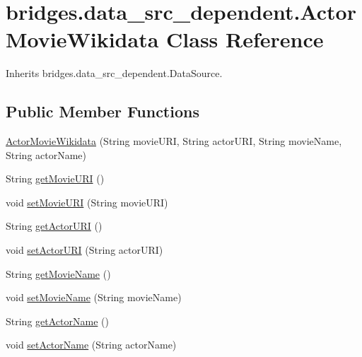 \hypertarget{classbridges_1_1data__src__dependent_1_1_actor_movie_wikidata}{}\section{bridges.\+data\+\_\+src\+\_\+dependent.\+Actor\+Movie\+Wikidata Class Reference}
\label{classbridges_1_1data__src__dependent_1_1_actor_movie_wikidata}


Inherits bridges.\+data\+\_\+src\+\_\+dependent.\+Data\+Source.

\subsection*{Public Member Functions}
\begin{DoxyCompactItemize}
\item 
\mbox{\hyperlink{classbridges_1_1data__src__dependent_1_1_actor_movie_wikidata_a0204efcc0ee869cf059228b99965a9ad}{Actor\+Movie\+Wikidata}} (String movie\+U\+RI, String actor\+U\+RI, String movie\+Name, String actor\+Name)
\item 
String \mbox{\hyperlink{classbridges_1_1data__src__dependent_1_1_actor_movie_wikidata_a36b856c85ef3e634c6f6cb79402c1469}{get\+Movie\+U\+RI}} ()
\item 
void \mbox{\hyperlink{classbridges_1_1data__src__dependent_1_1_actor_movie_wikidata_a83b6e202e9ff88aa0d5afbc467edabc7}{set\+Movie\+U\+RI}} (String movie\+U\+RI)
\item 
String \mbox{\hyperlink{classbridges_1_1data__src__dependent_1_1_actor_movie_wikidata_a39fb69868ed39bb9c43cf512300e47a3}{get\+Actor\+U\+RI}} ()
\item 
void \mbox{\hyperlink{classbridges_1_1data__src__dependent_1_1_actor_movie_wikidata_a48281ef156f333742f0377820e35d461}{set\+Actor\+U\+RI}} (String actor\+U\+RI)
\item 
String \mbox{\hyperlink{classbridges_1_1data__src__dependent_1_1_actor_movie_wikidata_a8c10a2fbd4db1223dfb6c115457bbfa0}{get\+Movie\+Name}} ()
\item 
void \mbox{\hyperlink{classbridges_1_1data__src__dependent_1_1_actor_movie_wikidata_ab327cb180c9912357318efa02ee1ea40}{set\+Movie\+Name}} (String movie\+Name)
\item 
String \mbox{\hyperlink{classbridges_1_1data__src__dependent_1_1_actor_movie_wikidata_a46d666a914ade6d3fcc99ddfd8d104bf}{get\+Actor\+Name}} ()
\item 
void \mbox{\hyperlink{classbridges_1_1data__src__dependent_1_1_actor_movie_wikidata_adcc408940f750be41cc25d70653dac07}{set\+Actor\+Name}} (String actor\+Name)
\end{DoxyCompactItemize}


